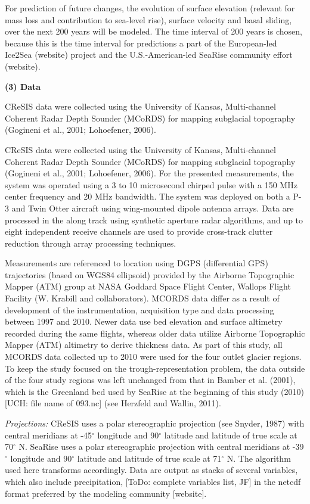 \documentclass[11pt]{article}
\begin{document}
For prediction of future changes, the evolution of surface elevation (relevant for mass loss and contribution to sea-level rise),
surface velocity and basal sliding, over the next 200 years will be modeled.
 The time interval of 200 years is chosen, because this is the time interval for predictions a part of the European-led Ice2Sea  (website) project and the U.S.-American-led SeaRise community effort (website).



\bs
 {\bf (3)  Data}
 
 

 CReSIS data were collected using the University of Kansas, Multi-channel
Coherent Radar Depth Sounder (MCoRDS) for mapping subglacial topography
(Gogineni et al., 2001; Lohoefener, 2006).  

CReSIS data were collected using the University of Kansas, Multi-channel
Coherent Radar Depth Sounder (MCoRDS) for mapping subglacial topography
(Gogineni et al., 2001; Lohoefener, 2006).  For the presented
measurements, the system was operated using a 3 to 10 microsecond chirped
pulse with a 150 MHz center frequency and 20 MHz bandwidth.  The system
was deployed on both a P-3 and Twin Otter aircraft using wing-mounted
dipole antenna arrays.  Data are processed in the along track using
synthetic aperture radar algorithms, and up to eight independent receive
channels are used to provide cross-track clutter reduction through array
processing techniques. 


 Measurements are referenced to location using DGPS (differential GPS) trajectories (based on WGS84 ellipsoid) provided by the
Airborne Topographic Mapper (ATM) group at NASA Goddard Space Flight Center,
Wallops Flight Facility (W. Krabill and collaborators).
  MCORDS data differ as a result of development of the instrumentation, acquisition type and data processing between 1997 and 2010. Newer data use bed elevation and surface altimetry recorded during the same flights, whereas older data utilize Airborne Topographic Mapper (ATM) altimetry to derive thickness data. 
As part of this study, all MCORDS data collected up to 2010 were used for the four outlet glacier regions. 
To keep the study focused on the trough-representation problem, the data outside of the four study regions was left unchanged from that in Bamber et al. (2001), which is the Greenland bed used by SeaRise at the beginning of this study (2010) [UCH: file name of 093.nc] (see Herzfeld and Wallin,  2011).

 
 {\it Projections:} CReSIS uses a polar stereographic projection (see Snyder, 1987) with central meridians at -45$^\circ$ longitude and
 90$^\circ$ latitude and latitude of true scale at 70$^\circ$ N.
 SeaRise uses a polar stereographic projection with central meridians at -39$^\circ$ longitude and
 90$^\circ$ latitude and latitude of true scale at 71$^\circ$ N. The algorithm used here transforms accordingly. Data are output as stacks of several variables, which also include precipitation, [ToDo: complete variables list, JF] in the netcdf format preferred by the modeling community [website].
\end{document}
